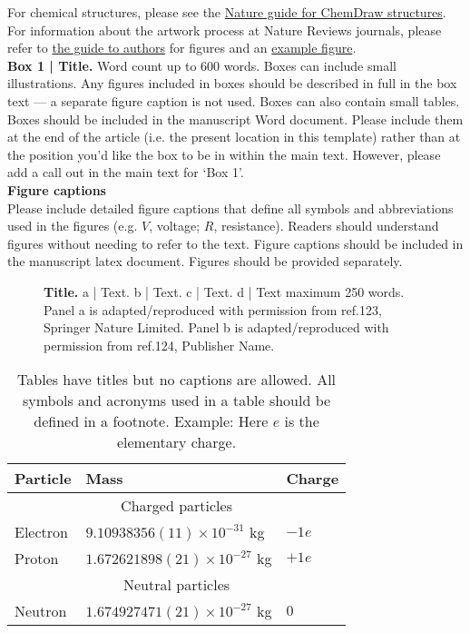 \documentclass[fleqn,10pt]{wlscirep}
\begin{document}
\noindent For chemical structures, please see the \href {https://www.nature.com/documents/nr-chemical-structures-guide.pdf}{Nature guide for ChemDraw structures}.\\

\noindent For information about the artwork process at Nature Reviews journals, please refer to \href{https://www.nature.com/reviews/pdf/artworkguide.pdf}{the guide to authors} for figures and an  \href{http://www.nature.com/reviews/pdf/artworkguidep2.pdf}{example figure}.\\

\noindent \textbf{Box 1 | Title.}
Word count up to 600 words. Boxes can include small illustrations. Any figures included in boxes should be described in full in the box text — a separate figure caption is not used. Boxes can also contain small tables. Boxes should be included in the manuscript Word document.  Please include them at the end of the article (i.e. the present location in this template) rather than at the position you’d like the box to be in within the main text.  However, please add a call out in the main text for ‘Box 1’.\\

\noindent \textbf{Figure captions}\\
\noindent Please include detailed figure captions that define all symbols and abbreviations used in the figures (e.g. $V$, voltage; $R$, resistance). Readers should understand figures without needing to refer to the text. Figure captions should be included in the manuscript latex document. Figures should be provided separately.\\

\begin{figure}[ht]
\centering
\caption{\textbf{Title.} a | Text. b | Text. c | Text. d | Text maximum 250 words. Panel a is adapted/reproduced with permission from ref.123, Springer Nature Limited. Panel b is adapted/reproduced with permission from ref.124, Publisher Name.}
\label{fig}
\end{figure}



\begin{table}[ht]
\centering
\begin{tabular}{|l|l|l|}
\hline
Particle & Mass & Charge \\
\hline
 \multicolumn{3}{|c|}{Charged particles}\\
\hline
Electron & $9.10938356(11)\times10^{-31}$ kg & $-1e$ \\
\hline
Proton & $1.672621898(21)\times10^{-27}$ kg & $+1e$ \\
\hline
 \multicolumn{3}{|c|}{Neutral particles}\\
\hline
Neutron & $1.674927471(21)\times10^{-27}$ kg & $0$ \\
\hline
\end{tabular}
\caption{\label{tab}Tables have titles but no captions are allowed. All symbols and acronyms used in a table should be defined in a footnote. Example: Here $e$ is the elementary charge.}
\end{table}
\end{document}
